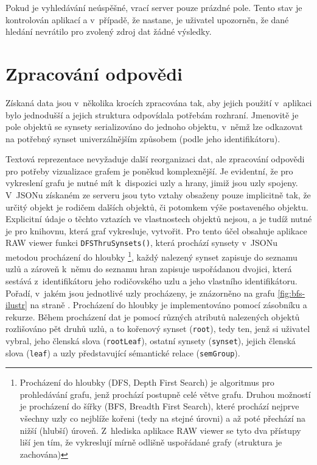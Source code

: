 \documentclass[a4paper,11pt,openany,twoside]{book}
\newcommand{\simplywn}{RAW viewer }
\begin{document}
					Pokud je vyhledávání neúspěšné, vrací server pouze prázdné pole. Tento stav je kontrolován aplikací a v~případě, že nastane, je uživatel upozorněn, že dané hledání nevrátilo pro zvolený zdroj dat žádné výsledky. 

			\section{Zpracování odpovědi}
			\label{cha:zpracovani}

				Získaná data jsou v~několika krocích zpracována tak, aby jejich použití v~aplikaci bylo jednodušší a jejich struktura odpovídala potřebám rozhraní. Jmenovitě je pole objektů se synsety serializováno do jednoho objektu, v~němž lze odkazovat na potřebný synset univerzálnějším způsobem (podle jeho identifikátoru). 

				Textová reprezentace nevyžaduje další reorganizaci dat, ale zpracování odpovědi pro potřeby vizualizace grafem je poněkud komplexnější. Je evidentní, že pro vykreslení grafu je nutné mít k~dispozici uzly a hrany, jimiž jsou uzly spojeny. V~JSONu získaném ze serveru jsou tyto vztahy obsaženy pouze implicitně tak, že určitý objekt je rodičem dalších objektů, či potomkem výše postaveného objektu. Explicitní údaje o těchto vztazích ve vlastnostech objektů nejsou, a je tudíž nutné je pro knihovnu, která graf vykresluje, vytvořit. Pro tento účel obsahuje aplikace \simplywn funkci \texttt{DFSThruSynsets()}, která prochází synsety v~JSONu metodou procházení do hloubky%
				\footnote{Procházení do hloubky (DFS, Depth	First Search) je algoritmus pro prohledávání grafu, jenž prochází postupně celé větve grafu.  Druhou možností je procházení do šířky (BFS, Breadth First Search), které prochází nejprve všechny uzly co nejblíže kořeni (tedy na stejné úrovni) a až poté přechází na nižší (hlubší) úroveň. \parencite{epstein1996ics} Z~hlediska aplikace \simplywn se tyto dva přístupy liší jen tím, že vykreslují mírně odlišně uspořádané grafy (struktura je zachována)}, každý nalezený synset zapisuje do seznamu uzlů a zároveň k~němu do seznamu hran zapisuje uspořádanou dvojici, která sestává z~identifikátoru jeho rodičovského uzlu a jeho vlastního identifikátoru. Pořadí, v~jakém jsou jednotlivé uzly procházeny, je znázorněno na grafu \ref{fig:bfs-ilustr} na straně \pageref{fig:bfs-ilustr}. Procházení do hloubky je implementováno pomocí zásobníku a rekurze. Během procházení dat je pomocí různých atributů nalezených objektů rozlišováno pět druhů uzlů, a to kořenový synset (\texttt{root}), tedy ten, jenž si uživatel vybral, jeho členská slova (\texttt{rootLeaf}), ostatní synsety (\texttt{synset}), jejich členská slova (\texttt{leaf}) a uzly představující sémantické relace (\texttt{semGroup}). 
\end{document}
